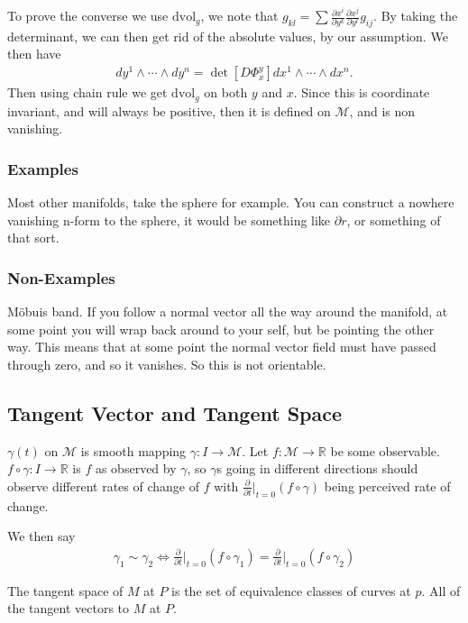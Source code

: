 \documentclass[10pt]{amsart}
\newcommand{\p}{\partial}
\newcommand{\ra}{\rightarrow}
\newcommand{\dvol}{\text{dvol}_g}
\newcommand{\M}{\mathcal{M}}
\newcommand{\R}{\mathbb{R}}
\renewcommand{\o}{\circ}
\newcommand{\wfb}{dx^1\wedge\cdots\wedge dx^n}
\newcommand{\wfby}{dy^1\wedge\cdots\wedge dy^n}
\renewcommand{\*}{\star}
\newcommand{\pder}[2]{\frac{\partial #1}{\partial #2}}
\begin{document}
To prove the converse we use $\dvol$, we note that
$g_{kl}=\sum\pder{x^i}{y^k}\pder{x^j}{y^l}g_{ij}$. By taking the determinant,
we can then get rid of the absolute values, by our assumption. We then have
\begin{align*}
  \wfby=\det\left[D\Phi_x^y\right]\wfb.
\end{align*}
Then using chain rule we get $\dvol$ on both $y$ and $x$. Since this is
coordinate invariant, and will always be positive, then it is defined on $\M$,
and is non vanishing.

\subsubsection{Examples}%
\label{ssub:examples}

Most other manifolds, take the sphere for example. You can construct a nowhere
vanishing n-form to the sphere, it would be something like $\p r$, or something
of that sort.

\subsubsection{Non-Examples}%
\label{ssub:non_examples}

M\"obuis band. If you follow a normal vector all the way around the manifold,
at some point you will wrap back around to your self, but be pointing the other
way. This means that at some point the normal vector field must have passed
through zero, and so it vanishes. So this is not orientable.

\subsection{Tangent Vector and Tangent Space}%
\label{sub:tangent_vector_and_tangent_space}

$\gamma(t)$ on $\M$ is smooth mapping $\gamma:I\ra\M$. Let $f:\M\ra\R$ be some
observable. $f\o\gamma:I\ra\R$ is $f$ as observed by $\gamma$, so $\gamma$s
going in different directions should observe different rates of change of $f$
with $\pder{}{t}\Bigr|_{t=0}(f\o\gamma)$ being perceived rate of change.

We then say
\begin{align*}
  \gamma_1\sim\gamma_2\iff\pder{}{t}\Bigr|_{t=0}(f\o\gamma_1)=\pder{}{t}\Bigr|_{t=0}(f\o\gamma_2)
\end{align*}

The tangent space of $M$ at $P$ is the set of equivalence classes of curves at
$p$. All of the tangent vectors to $M$ at $P$.
\end{document}

